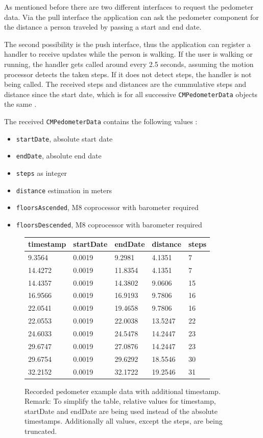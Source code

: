 As mentioned before there are two different interfaces to request the pedometer data.
Via the pull interface the application can ask the pedometer component for the distance a person traveled by passing a start and end date.

The second possibility is the push interface, thus the application can register a handler to receive updates while the person is walking.
If the user is walking or running, the handler gets called around every 2.5 seconds, assuming the motion processor detects the taken steps.
If it does not detect steps, the handler is not being called.
The received steps and distances are the cummulative steps and distance since the start date, which is for all successive \texttt{CMPedometerData} objects the same \cite{wwdc_2014}.

The received \texttt{CMPedometerData} contains the following values \cite{ios_cm}:
\begin{itemize}
  \item \texttt{startDate}, absolute start date
  \item \texttt{endDate}, absolute end date
  \item \texttt{steps} as integer
  \item \texttt{distance} estimation in meters
  \item \texttt{floorsAscended}, M8 coprocessor with barometer required
  \item \texttt{floorsDescended}, M8 coprocessor with barometer required
\end{itemize}

\begin{center}
\begin{figure}
\begin{tabular}{*{5}{l}}
timestamp & startDate & endDate & distance & steps\\
\hline
9.3564 & 0.0019 & 9.2981 & 4.1351 & 7\\
14.4272 & 0.0019 & 11.8354 & 4.1351 & 7\\
14.4357 & 0.0019 & 14.3802 & 9.0606 & 15\\
16.9566 & 0.0019 & 16.9193 & 9.7806 & 16\\
22.0541 & 0.0019 & 19.4658 & 9.7806 & 16\\
22.0553 & 0.0019 & 22.0038 & 13.5247 & 22\\
24.6033 & 0.0019 & 24.5478 & 14.2447 & 23\\
29.6747 & 0.0019 & 27.0876 & 14.2447 & 23\\
29.6754 & 0.0019 & 29.6292 & 18.5546 & 30\\
32.2152 & 0.0019 & 32.1722 & 19.2546 & 31\\
\end{tabular}
\caption{Recorded pedometer example data with additional timestamp.
Remark: To simplify the table, relative values for timestamp, startDate and endDate are being used instead of the absolute timestamps.
Additionally all values, except the steps, are being truncated.}
\label{fig:pedometerExampleData}
\end{figure}
\end{center}

